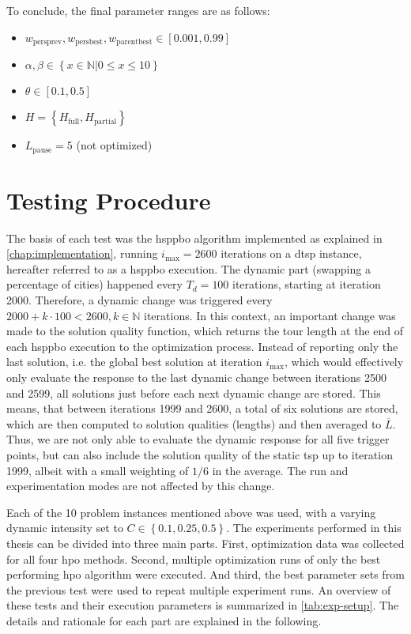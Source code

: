 To conclude, the final parameter ranges are as follows:
\begin{itemize}
	\item $w_{\text{persprev}}, w_{\text{persbest}}, w_{\text{parentbest}} \in [0.001,0.99]$
	\item $\alpha, \beta \in \left\lbrace x\in\mathbb{N} | 0 \leq x \leq 10 \right\rbrace$
	\item $\theta \in [0.1,0.5]$
	\item $H = \left\lbrace H_{\text{full}}, H_{\text{partial}} \right\rbrace$
	\item $L_\text{pause} = 5$ (not optimized)
	
\end{itemize}

\section{Testing Procedure}
\label{chap:testing}

The basis of each test was the \gls{hsppbo} algorithm implemented as explained in \cref{chap:implementation}, running $i_\text{max} = 2600$ iterations on a \gls{dtsp} instance, hereafter referred to as a \gls{hsppbo} execution. The dynamic part (swapping a percentage of cities) happened every $T_d = 100$ iterations, starting at iteration 2000. Therefore, a dynamic change was triggered every $2000 + k \cdot 100 < 2600, k \in \mathbb{N}$ iterations. In this context, an important change was made to the solution quality function, which returns the tour length at the end of each \gls{hsppbo} execution to the optimization process. Instead of reporting only the last solution, i.e. the global best solution at iteration $i_\text{max}$, which would effectively only evaluate the response to the last dynamic change between iterations 2500 and 2599, all solutions just before each next dynamic change are stored. This means, that between iterations 1999 and 2600, a total of six solutions are stored, which are then computed to solution qualities (lengths) and then averaged to $\overline{L}$. Thus, we are not only able to evaluate the dynamic response for all five trigger points, but can also include the solution quality of the static \gls{tsp} up to iteration 1999, albeit with a small weighting of $1/6$ in the average. The run and experimentation modes are not affected by this change.

Each of the 10 problem instances mentioned above was used, with a varying dynamic intensity set to $C \in \left\lbrace 0.1,0.25,0.5\right\rbrace$. The experiments performed in this thesis can be divided into three main parts. First, optimization data was collected for all four \gls{hpo} methods. Second, multiple optimization runs of only the best performing \gls{hpo} algorithm were executed. And third, the best parameter sets from the previous test were used to repeat multiple experiment runs. An overview of these tests and their execution parameters is summarized in \cref{tab:exp-setup}. The details and rationale for each part are explained in the following. 

